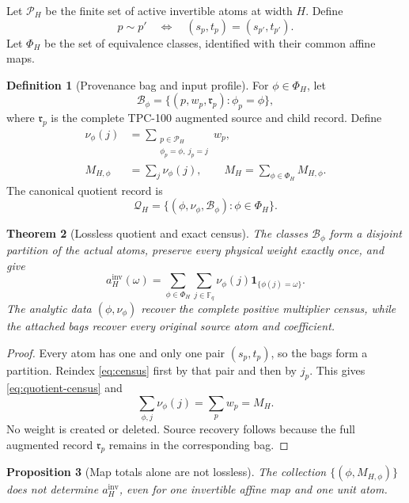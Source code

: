 \documentclass[11pt]{article}
\newtheorem{theorem}{Theorem}[section]
\newtheorem{proposition}[theorem]{Proposition}
\theoremstyle{definition}
\newtheorem{definition}[theorem]{Definition}
\theoremstyle{remark}
\newcommand{\F}{\mathbb F}
\newcommand{\one}{\mathbf 1}
\begin{document}
Let \(\mathscr P_H\) be the finite set of active invertible atoms at
width \(H\).  Define
\[
 p\sim p'
 \quad\Longleftrightarrow\quad
 (s_p,t_p)=(s_{p'},t_{p'}).
\]
Let \(\Phi_H\) be the set of equivalence classes, identified with
their common affine maps.

\begin{definition}[Provenance bag and input profile]
\label{def:profile}
For \(\phi\in\Phi_H\), let
\[
 \mathscr B_\phi
 =
 \{(p,w_p,\mathfrak r_p):\phi_p=\phi\},
\]
where \(\mathfrak r_p\) is the complete TPC-100 augmented source
and child record.  Define
\begin{align}
 \nu_\phi(j)
 &=
 \sum_{\substack{p\in\mathscr P_H\\
                  \phi_p=\phi,\ j_p=j}}w_p,
\label{eq:profile}\\
 M_{H,\phi}
 &=
 \sum_j\nu_\phi(j),\qquad
 M_H=\sum_{\phi\in\Phi_H}M_{H,\phi}.
\label{eq:class-mass}
\end{align}
The canonical quotient record is
\[
 \mathscr Q_H
 =
 \{(\phi,\nu_\phi,\mathscr B_\phi):\phi\in\Phi_H\}.
\]
\end{definition}

\begin{theorem}[Lossless quotient and exact census]
\label{thm:quotient}
The classes \(\mathscr B_\phi\) form a disjoint partition of the
actual atoms, preserve every physical weight exactly once, and give
\begin{equation}
 \boxed{
 a_H^{\mathrm{inv}}(\omega)
 =
 \sum_{\phi\in\Phi_H}\sum_{j\in\F_q}
 \nu_\phi(j)\one_{\{\phi(j)=\omega\}}.}
\label{eq:quotient-census}
\end{equation}
The analytic data \((\phi,\nu_\phi)\) recover the complete positive
multiplier census, while the attached bags recover every original
source atom and coefficient.
\end{theorem}

\begin{proof}
Every atom has one and only one pair \((s_p,t_p)\), so the bags form
a partition.  Reindex \eqref{eq:census} first by that pair and then
by \(j_p\).  This gives \eqref{eq:quotient-census} and
\[
 \sum_{\phi,j}\nu_\phi(j)=\sum_pw_p=M_H.
\]
No weight is created or deleted.  Source recovery follows because
the full augmented record \(\mathfrak r_p\) remains in the
corresponding bag.
\end{proof}

\begin{proposition}[Map totals alone are not lossless]
\label{prop:mass-only}
The collection \(\{(\phi,M_{H,\phi})\}\) does not determine
\(a_H^{\mathrm{inv}}\), even for one invertible affine map and one
unit atom.
\end{proposition}
\end{document}
